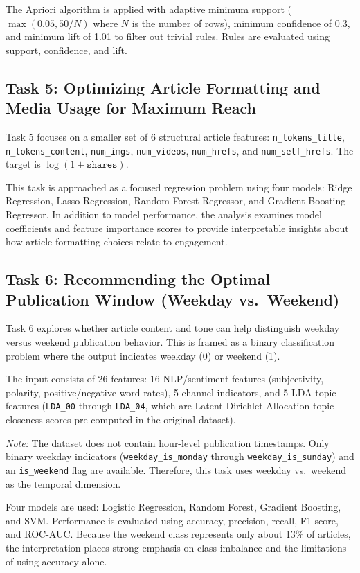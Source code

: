 The Apriori algorithm \cite{agrawal1994association} is applied with adaptive minimum support ($\max(0.05, 50 / N)$ where $N$ is the number of rows), minimum confidence of 0.3, and minimum lift of 1.01 to filter out trivial rules. Rules are evaluated using support, confidence, and lift.

\subsection{Task 5: Optimizing Article Formatting and Media Usage for Maximum Reach}
Task 5 focuses on a smaller set of 6 structural article features: \texttt{n\_tokens\_title}, \texttt{n\_tokens\_content}, \texttt{num\_imgs}, \texttt{num\_videos}, \texttt{num\_hrefs}, and \texttt{num\_self\_hrefs}. The target is $\log(1 + \texttt{shares})$.

This task is approached as a focused regression problem using four models: Ridge Regression, Lasso Regression, Random Forest Regressor, and Gradient Boosting Regressor. In addition to model performance, the analysis examines model coefficients and feature importance scores to provide interpretable insights about how article formatting choices relate to engagement.

\subsection{Task 6: Recommending the Optimal Publication Window (Weekday vs.\ Weekend)}
Task 6 explores whether article content and tone can help distinguish weekday versus weekend publication behavior. This is framed as a binary classification problem where the output indicates weekday (0) or weekend (1).

The input consists of 26 features: 16 NLP/sentiment features (subjectivity, polarity, positive/negative word rates), 5 channel indicators, and 5 LDA topic features (\texttt{LDA\_00} through \texttt{LDA\_04}, which are Latent Dirichlet Allocation topic closeness scores pre-computed in the original dataset).

\textit{Note:} The dataset does not contain hour-level publication timestamps. Only binary weekday indicators (\texttt{weekday\_is\_monday} through \texttt{weekday\_is\_sunday}) and an \texttt{is\_weekend} flag are available. Therefore, this task uses weekday vs.\ weekend as the temporal dimension.

Four models are used: Logistic Regression, Random Forest, Gradient Boosting, and SVM. Performance is evaluated using accuracy, precision, recall, F1-score, and ROC-AUC. Because the weekend class represents only about 13\% of articles, the interpretation places strong emphasis on class imbalance and the limitations of using accuracy alone.

